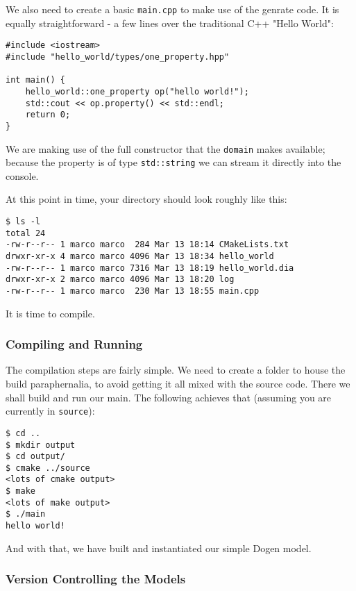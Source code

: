 \documentclass[11pt]{article}
\begin{document}
We also need to create a basic \texttt{main.cpp} to make use of the genrate
code. It is equally straightforward - a few lines over the traditional
C++ "Hello World":

\begin{verbatim}
#include <iostream>
#include "hello_world/types/one_property.hpp"

int main() {
    hello_world::one_property op("hello world!");
    std::cout << op.property() << std::endl;
    return 0;
}
\end{verbatim}

We are making use of the full constructor that the \texttt{domain} makes
available; because the property is of type \texttt{std::string} we can stream
it directly into the console.

At this point in time, your directory should look roughly like this:

\begin{verbatim}
$ ls -l
total 24
-rw-r--r-- 1 marco marco  284 Mar 13 18:14 CMakeLists.txt
drwxr-xr-x 4 marco marco 4096 Mar 13 18:34 hello_world
-rw-r--r-- 1 marco marco 7316 Mar 13 18:19 hello_world.dia
drwxr-xr-x 2 marco marco 4096 Mar 13 18:20 log
-rw-r--r-- 1 marco marco  230 Mar 13 18:55 main.cpp
\end{verbatim}

It is time to compile.

\subsubsection{Compiling and Running}
\label{sec-3-2-4}

The compilation steps are fairly simple. We need to create a folder to
house the build paraphernalia, to avoid getting it all mixed with the
source code. There we shall build and run our main. The following
achieves that (assuming you are currently in \texttt{source}):

\begin{verbatim}
$ cd ..
$ mkdir output
$ cd output/
$ cmake ../source
<lots of cmake output>
$ make
<lots of make output>
$ ./main
hello world!
\end{verbatim}

And with that, we have built and instantiated our simple Dogen model.

\subsubsection{Version Controlling the Models}
\label{sec-3-2-5}
\end{document}
